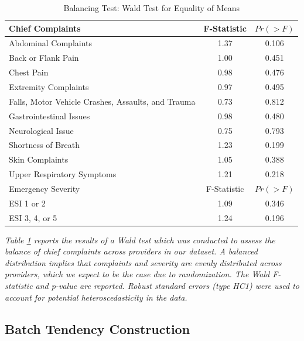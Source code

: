 \documentclass[,,nonblindrev]{informs}
\begin{document}
\begin{table}[htbp]
    \centering
    \caption{Balancing Test: Wald Test for Equality of Means}
    \label{tab:wald_test}
    \begin{tabular}{p{11cm}cc}
        \toprule
        Chief Complaints & F-Statistic & $Pr(> F)$ \\
        \midrule
        Abdominal Complaints & 1.37 & 0.106 \\
        Back or Flank Pain & 1.00 & 0.451 \\
        Chest Pain & 0.98 & 0.476 \\
        Extremity Complaints & 0.97 & 0.495 \\
        Falls, Motor Vehicle Crashes, Assaults, and Trauma & 0.73 & 0.812 \\
        Gastrointestinal Issues & 0.98 & 0.480 \\
        Neurological Issue & 0.75 & 0.793 \\
        Shortness of Breath & 1.23 & 0.199 \\
        Skin Complaints & 1.05 & 0.388 \\
        Upper Respiratory Symptoms & 1.21 & 0.218 \\
        \midrule
        Emergency Severity & F-Statistic & $Pr(> F)$ \\
        \midrule
        ESI 1 or 2 & 1.09 & 0.346 \\
        ESI 3, 4, or 5 & 1.24 & 0.196 \\
        \bottomrule
    \end{tabular}
\begin{tablenotes}
\tiny
\item \textit{Table \ref{tab:wald_test} reports the results of a Wald test which was conducted to assess the balance of chief complaints across providers in our dataset. A balanced distribution implies that complaints and severity are evenly distributed across providers, which we expect to be the case due to randomization. The Wald F-statistic and p-value are reported. Robust standard errors (type HC1) were used to account for potential heteroscedasticity in the data.}
\end{tablenotes}
\end{table}

\hypertarget{batch-tendency-construction}{%
\subsection{Batch Tendency
Construction}\label{batch-tendency-construction}}
\end{document}
